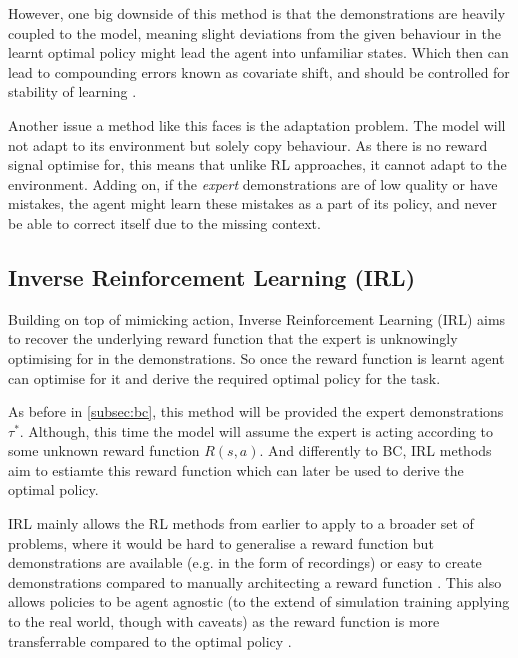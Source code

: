 However, one big downside of this method is that the demonstrations are heavily coupled to the model, meaning slight deviations from the given behaviour in the learnt optimal policy might lead the agent into unfamiliar states. Which then can lead to compounding errors known as covariate shift, and should be controlled for stability of learning \cite{mehta2024stablebccontrollingcovariateshift}. 
 \label{para:covariate-shift}
 
 Another issue a method like this faces is the adaptation problem. The model will not adapt to its environment but solely copy behaviour. As there is no reward signal optimise for, this means that unlike RL approaches, it cannot adapt to the environment. Adding on, if the \emph{expert} demonstrations are of low quality or have mistakes, the agent might learn these mistakes as a part of its policy, and never be able to correct itself due to the missing context.


\subsection{Inverse Reinforcement Learning (IRL)}
Building on top of mimicking action, Inverse Reinforcement Learning (IRL) aims to recover the underlying reward function that the expert is unknowingly optimising for in the demonstrations. So once the reward function is learnt agent can optimise for it and derive the required optimal policy for the task.

 
As before in \ref{subsec:bc}, this method will be provided the expert demonstrations $\tau^*$. Although, this time the model will assume the expert is acting according to some unknown reward function $R\left(s, a\right)$. And differently to BC, IRL methods aim to estiamte this reward function which can later be used to derive the optimal policy.



IRL mainly allows the RL methods from earlier to apply to a broader set of problems, where it would be hard to generalise a reward function but demonstrations are available (e.g. in the form of recordings) or easy to create demonstrations compared to manually architecting a reward function \cite{ARORA2021103500}. This also allows policies to be agent agnostic (to the extend of simulation training applying to the real world, though with caveats) as the reward function is more transferrable compared to the optimal policy \cite{russell1998learning}.

